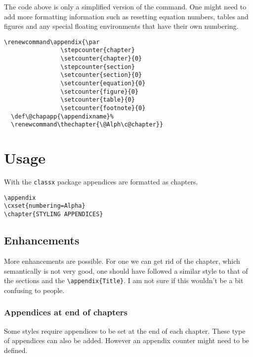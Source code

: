 The code above is only a simplified version of the command. One might need to add more formatting information such as resetting equation numbers, tables and figures and any special floating environments that have their own numbering.

\begin{tcolorbox}[width=\linewidth]
\begin{lstlisting}
\renewcommand\appendix{\par
                \stepcounter{chapter}
                \setcounter{chapter}{0}
                \stepcounter{section}
                \setcounter{section}{0}
                \setcounter{equation}{0}
                \setcounter{figure}{0}
                \setcounter{table}{0}
                \setcounter{footnote}{0}
  \def\@chapapp{\appendixname}%
  \renewcommand\thechapter{\@Alph\c@chapter}}
\end{lstlisting}
\end{tcolorbox}


\section{Usage}

With the \lstinline{classx} package appendices are formatted as chapters.

\begin{tcolorbox}[width=\linewidth]
\begin{lstlisting}
\appendix
\cxset{numbering=Alpha}
\chapter{STYLING APPENDICES}
\end{lstlisting}
\end{tcolorbox}

\subsection{Enhancements}
More enhancements are possible. For one we can get rid of the chapter, which semantically is not very good, one should have followed a similar style to that of the sections and the \lstinline!\appendix{Title}!. I am not sure if this wouldn't be a bit confusing to people.

\subsubsection{Appendices at end of chapters}
Some styles require appendices to be set at the end of each chapter. These type of appendices can also be added. However an appendix counter might need to be defined.

